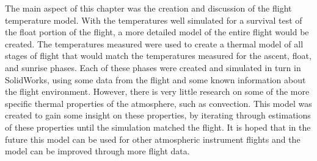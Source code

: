 The main aspect of this chapter was the creation and discussion of the flight temperature model. With the temperatures well simulated for a survival test of the float portion of the flight, a more detailed model of the entire flight would be created. The temperatures measured were used to create a thermal model of all stages of flight that would match the temperatures measured for the ascent, float, and sunrise phases. Each of these phases were created and simulated in turn in SolidWorks, using some data from the flight and some known information about the flight environment. However, there is very little research on some of the more specific thermal properties of the atmosphere, such as convection. This model was created to gain some insight on these properties, by iterating through estimations of these properties until the simulation matched the flight. It is hoped that in the future this model can be used for other atmospheric instrument flights and the model can be improved through more flight data.

